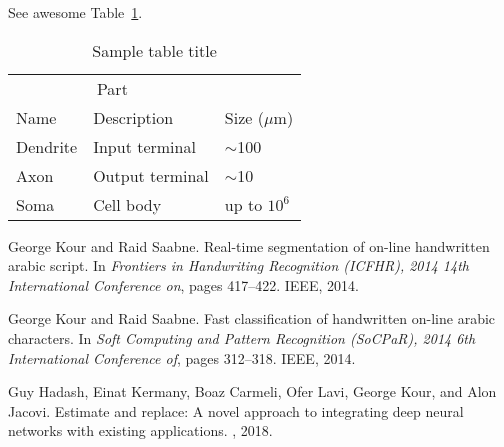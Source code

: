 \documentclass{article}
\begin{document}
See awesome Table~\ref{tab:table}.

\begin{table}
 \caption{Sample table title}
  \centering
  \begin{tabular}{lll}
    \toprule
    \multicolumn{2}{c}{Part}                   \\
    \cmidrule(r){1-2}
    Name     & Description     & Size ($\mu$m) \\
    \midrule
    Dendrite & Input terminal  & $\sim$100     \\
    Axon     & Output terminal & $\sim$10      \\
    Soma     & Cell body       & up to $10^6$  \\
    \bottomrule
  \end{tabular}
  \label{tab:table}
\end{table}




  


\begin{thebibliography}{1}

George Kour and Raid Saabne.
\newblock Real-time segmentation of on-line handwritten arabic script.
\newblock In {\em Frontiers in Handwriting Recognition (ICFHR), 2014 14th
  International Conference on}, pages 417--422. IEEE, 2014.

George Kour and Raid Saabne.
\newblock Fast classification of handwritten on-line arabic characters.
\newblock In {\em Soft Computing and Pattern Recognition (SoCPaR), 2014 6th
  International Conference of}, pages 312--318. IEEE, 2014.

Guy Hadash, Einat Kermany, Boaz Carmeli, Ofer Lavi, George Kour, and Alon
  Jacovi.
\newblock Estimate and replace: A novel approach to integrating deep neural
  networks with existing applications.
, 2018.

\end{thebibliography}
\end{document}
